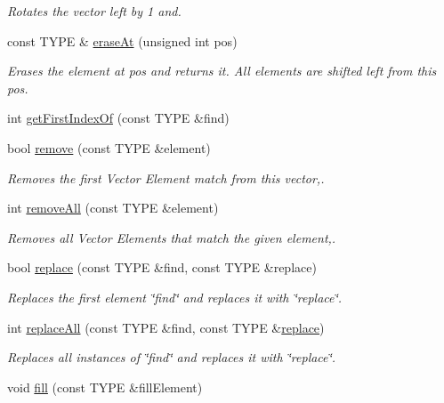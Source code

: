 \begin{DoxyCompactItemize}
\begin{DoxyCompactList}\small\item\em Rotates the vector left by 1 and. \end{DoxyCompactList}\item 
const T\+Y\+PE \& \hyperlink{classVECTOR_a904e89caaeea23372c1ca66d22714ab2}{erase\+At} (unsigned int pos)
\begin{DoxyCompactList}\small\item\em Erases the element at pos and returns it. All elements are shifted left from this pos. \end{DoxyCompactList}\item 
int \hyperlink{classVECTOR_a5ccb990cf628658f4e910acdf4f63dfe}{get\+First\+Index\+Of} (const T\+Y\+PE \&find)
\item 
bool \hyperlink{classVECTOR_aaf7fbc53cd151e3577f8d5fce926f3c3}{remove} (const T\+Y\+PE \&element)
\begin{DoxyCompactList}\small\item\em Removes the first Vector Element match from this vector,. \end{DoxyCompactList}\item 
int \hyperlink{classVECTOR_a069a02c249b8ef9cd25eb02daeb64154}{remove\+All} (const T\+Y\+PE \&element)
\begin{DoxyCompactList}\small\item\em Removes all Vector Elements that match the given element,. \end{DoxyCompactList}\item 
bool \hyperlink{classVECTOR_a5a5030c05a121f2ffefd9494f6309b3a}{replace} (const T\+Y\+PE \&find, const T\+Y\+PE \&replace)
\begin{DoxyCompactList}\small\item\em Replaces the first element \char`\"{}find\char`\"{} and replaces it with \char`\"{}replace\char`\"{}. \end{DoxyCompactList}\item 
int \hyperlink{classVECTOR_a61e4cb6bdb0d5cbc9248defe84693aca}{replace\+All} (const T\+Y\+PE \&find, const T\+Y\+PE \&\hyperlink{classVECTOR_a5a5030c05a121f2ffefd9494f6309b3a}{replace})
\begin{DoxyCompactList}\small\item\em Replaces all instances of \char`\"{}find\char`\"{} and replaces it with \char`\"{}replace\char`\"{}. \end{DoxyCompactList}\item 
void \hyperlink{classVECTOR_a24c438279d407bd2a3bb04545e753495}{fill} (const T\+Y\+PE \&fill\+Element)

\end{DoxyCompactItemize}

